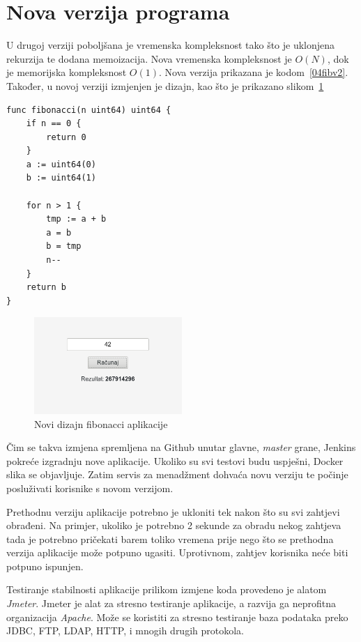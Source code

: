 \section{Nova verzija programa}
U drugoj verziji poboljšana je vremenska kompleksnost tako što je uklonjena rekurzija te dodana
memoizacija. Nova vremenska kompleksnost je $O(N)$, dok je memorijska kompleksnost $O(1)$. Nova
verzija prikazana je kodom~\ref{04fibv2}. Također, u novoj verziji izmjenjen je dizajn, kao što je
prikazano slikom~\ref{fig:04redesign}

\begin{lstlisting}[float=h]
func fibonacci(n uint64) uint64 {
	if n == 0 {
		return 0
	}
	a := uint64(0)
	b := uint64(1)

	for n > 1 {
		tmp := a + b
		a = b
		b = tmp
		n--
	}
	return b
}
\end{lstlisting}

\begin{figure}[h]
    \centering
    \includegraphics[width=0.5\textwidth]{img/04/new_app.png}
    \caption{Novi dizajn fibonacci aplikacije}%
    \label{fig:04redesign}
\end{figure}

Čim se takva izmjena spremljena na Github unutar glavne, \textit{master} grane, Jenkins pokreće
izgradnju nove aplikacije. Ukoliko su svi testovi budu uspješni, Docker slika se objavljuje. Zatim
servis za menadžment dohvaća novu verziju te počinje posluživati korisnike s novom verzijom.

Prethodnu verziju aplikacije potrebno je ukloniti tek nakon što su svi zahtjevi obrađeni. Na
primjer, ukoliko je potrebno 2 sekunde za obradu nekog zahtjeva tada je potrebno pričekati barem
toliko vremena prije nego što se prethodna verzija aplikacije može potpuno ugasiti. Uprotivnom,
zahtjev korisnika neće biti potpuno ispunjen.

Testiranje stabilnosti aplikacije prilikom izmjene koda provedeno je alatom \textit{Jmeter}. Jmeter
je alat za stresno testiranje aplikacije, a razvija ga neprofitna organizacija \textit{Apache}. Može
se koristiti za stresno testiranje baza podataka preko JDBC, FTP, LDAP, HTTP, i mnogih drugih
protokola.

